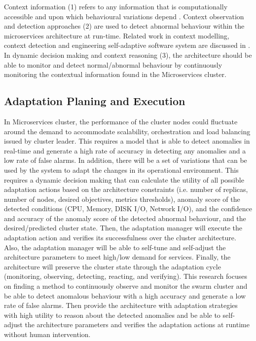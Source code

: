 Context information (1) refers to any information that is computationally accessible and upon which behavioural variations depend \cite{Hirschfeld:2008p1620}. Context observation and detection approaches (2) are used to detect abnormal behaviour within the microservices architecture at run-time. Related work in context modelling, context detection and engineering self-adaptive software system are discussed in \cite{Salehie:2009p3693,Cheng:2008p3708,RogeriodeLemos:2011tj,Strang:2004p3770}.  
In dynamic decision making and context reasoning (3), the architecture should be able to monitor and detect normal/abnormal behaviour by continuously monitoring the contextual information found in the Microservices cluster. 

\subsection{Adaptation Planing and Execution}
In Microservices cluster, the performance of the cluster nodes could fluctuate around the demand to accommodate scalability, orchestration and load balancing issued by cluster leader. This requires a model that is able to detect anomalies in real-time and generate a high rate of accuracy in detecting any anomalies and a low rate of false alarms. In addition, there will be a set of variations that can be used by the system to adapt the changes in its operational environment. This requires a dynamic decision making that can calculate the utility of all possible adaptation actions based on the architecture constraints (i.e. number of replicas, number of nodes, desired objectives, metrics thresholds), anomaly score of the detected conditions (CPU, Memory, DISK I/O, Network I/O), and the confidence and accuracy of the anomaly score of the detected abnormal behaviour, and the desired/predicted cluster state. Then, the adaptation manager will execute the adaptation action and verifies its successfulness over the cluster architecture. Also, the adaptation manager will be able to self-tune and self-adjust the architecture parameters to meet high/low demand for services. Finally, the architecture will preserve the cluster state through the adaptation cycle (monitoring, observing, detecting, reacting, and verifying). This research focuses on finding a method to continuously observe and monitor the swarm cluster and be able to detect anomalous behaviour with a high accuracy and generate a low rate of false alarms. Then provide the architecture with adaptation strategies with high utility to reason about the detected anomalies and be able to self-adjust the architecture parameters and verifies the adaptation actions at runtime without human intervention.


